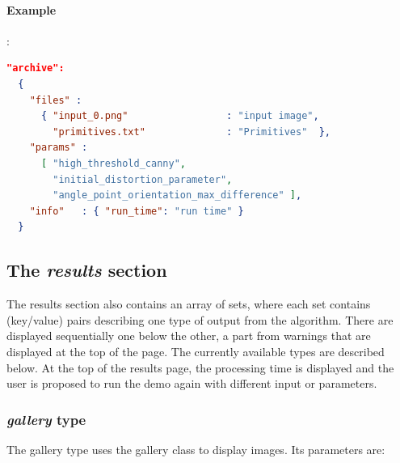 \paragraph{Example}:\\
\begin{lstlisting}[language=json,firstnumber=1]
"archive":
  {
    "files" : 
      { "input_0.png"                 : "input image",
        "primitives.txt"              : "Primitives"  },
    "params" :  
      [ "high_threshold_canny", 
        "initial_distortion_parameter", 
        "angle_point_orientation_max_difference" ],
    "info"   : { "run_time": "run time" }
  }
\end{lstlisting}

\subsection{The \emph{results} section}


The results section also contains an array of sets, where each set contains 
(key/value) pairs describing one type of output from the algorithm. There are 
displayed sequentially one below the other, a part from warnings that are 
displayed at the top of the page. The currently available types are described 
below. At the top of the results page, the processing time is displayed and the 
user is proposed to run the demo again with different input or parameters.


\subsubsection{ \emph{gallery} type}

The gallery type uses the gallery class to display images. Its parameters are:

